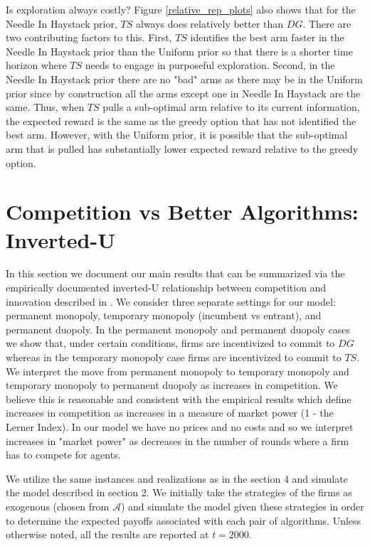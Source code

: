 \documentclass{article}
\theoremstyle{definition}
\begin{document}
Is exploration always costly? Figure \ref{relative_rep_plots} also shows that for the Needle In Haystack prior, $TS$ always does relatively better than $DG$. There are two contributing factors to this. First, $TS$ identifies the best arm faster in the Needle In Haystack prior than the Uniform prior so that there is a shorter time horizon where $TS$ needs to engage in purposeful exploration. Second, in the Needle In Haystack prior there are no "bad" arms as there may be in the Uniform prior since by construction all the arms except one in Needle In Haystack are the same. Thus, when $TS$ pulls a sub-optimal arm relative to its current information, the expected reward is the same as the greedy option that has not identified the best arm. However, with the Uniform prior, it is possible that the sub-optimal arm that is pulled has substantially lower expected reward relative to the greedy option.

\section{Competition vs Better Algorithms: Inverted-U}\label{section:5}

In this section we document our main results that can be summarized via the empirically documented inverted-U relationship between competition and innovation described in \citet{aghion2005competition}. We consider three separate settings for our model: permanent monopoly, temporary monopoly (incumbent vs entrant), and permanent duopoly. In the permanent monopoly and permanent duopoly cases we show that, under certain conditions, firms are incentivized to commit to $DG$ whereas in the temporary monopoly case firms are incentivized to commit to $TS$. We interpret the move from permanent monopoly to temporary monopoly and temporary monopoly to permanent duopoly as increases in competition. We believe this is reasonable and consistent with the empirical results which define increases in competition as increases in a measure of market power (1 - the Lerner Index). In our model we have no prices and no costs and so we interpret increases in "market power" as decreases in the number of rounds where a firm has to compete for agents.

We utilize the same instances and realizations as in the section 4 and simulate the model described in section 2. We initially take the strategies of the firms as exogenous (chosen from $\mathcal{A}$) and simulate the model given these strategies in order to determine the expected payoffs associated with each pair of algorithms. Unless otherwise noted, all the results are reported at $t = 2000$.
\end{document}
